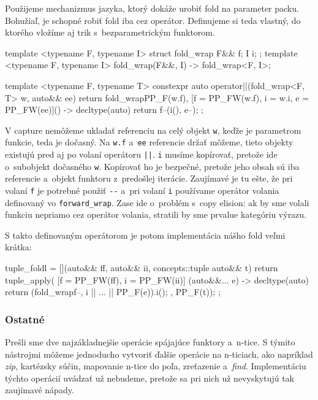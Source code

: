 Použijeme mechanizmus jazyka, ktorý dokáže urobiť fold na parameter packu. Bohužiaľ, \Cpp{} je schopné robiť fold iba cez operátor. Definujeme si teda vlastný, do ktorého vložíme aj trik s~bezparametrickým funktorom.
\begin{code}
template <typename F, typename I> struct fold_wrap { F&& f; I i; };
template <typename F, typename I> fold_wrap(F&&, I) -> fold_wrap<F, I>;

template <typename F, typename T>
constexpr auto operator||(fold_wrap<F, T> w, auto&& ee)
{ return fold_wrap{PP_F(w.f),
                   [f = PP_FW(w.f), i = w.i, e = PP_FW(ee)]()
                       -> decltype(auto)
                   { return f--(i(), e--); }}; }
\end{code}
V capture nemôžeme ukladať referenciu na celý objekt \texttt{w}, keďže je parametrom funkcie, teda je dočasný. Na \texttt{w.f} a~\texttt{ee} referencie držať môžeme, tieto objekty existujú pred aj po volaní operátoru \texttt{||}. \texttt{i} musíme kopírovať, pretože ide o~subobjekt dočasného \texttt{w}. Kopírovať ho je bezpečné, pretože jeho obsah sú iba referencie a~objekt funktoru z~predošlej iterácie. Zaujímavé je tu ešte, že pri volaní \texttt{f} je potrebné použiť \texttt{-{}-} a~pri volaní \texttt{i} používame operátor volania definovaný vo \texttt{forward\_wrap}. Zase ide o~problém s~copy elision: ak by sme volali funkciu nepriamo cez operátor volania, stratili by sme prvalue kategóriu výrazu.

S takto definovaným operátorom je potom implementácia nášho fold veľmi krátka:
\begin{code}
tuple_foldl =
    [](auto&& ff, auto&& ii, concepts::tuple auto&& t)
    { return tuple_apply(
          [f = PP_FW(ff), i = PP_FW(ii)]
          (auto&&... e) -> decltype(auto)
          { return (fold_wrap{f--, i} || ... || PP_F(e)).i(); },
          PP_F(t)); };
\end{code}

\subsubsection{Ostatné}

Prešli sme dve najzákladnejšie operácie spájajúce funktory a~n-tice. S týmito nástrojmi môžeme jednoducho vytvoriť ďalšie operácie na n-ticiach, ako napríklad \emph{zip}, kartézsky súčin, mapovanie n-tice do poľa, zreťazenie a~\emph{find}. Implementáciu týchto operácií uvádzať už nebudeme, pretože sa pri nich už nevyskytujú tak zaujímavé nápady.

